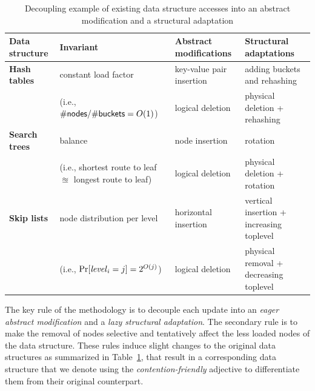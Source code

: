 \begin{table}
\begin{center}
{\footnotesize
\renewcommand{\tabcolsep}{1pt}
\renewcommand{\arraystretch}{1}
\begin{tabular}{|l|l|l|l|}%
  \hline
  {\bf Data structure} & {\bf Invariant} & {\bf Abstract modifications} & {\bf Structural adaptations} \\ \hline\hline

  {\bf Hash tables} & constant load factor & key-value pair insertion & adding buckets and rehashing \\
  & (i.e., $\#\lit{nodes} / \#\lit{buckets} = O(1)$) & logical deletion & physical deletion + rehashing\\ \hline
    {\bf Search trees} & balance & node insertion & rotation \\
  & (i.e., shortest route to leaf $\approxeq$ longest route to leaf) & logical deletion & physical deletion + rotation \\ \hline
  {\bf Skip lists} & node distribution per level & horizontal insertion & vertical insertion + increasing toplevel \\
  & (i.e., $\Pr[\ms{level}_i=j] = 2^{O(j)}$) & logical deletion & physical removal + decreasing toplevel \\ \hline
\end{tabular}}
\end{center}
\vspace{-1.5em}
\caption{\footnotesize Decoupling example of existing data structure accesses into an abstract modification and a structural adaptation\label{table:restructuring}}
\end{table}

The key rule of the methodology is to decouple each update into an \emph{eager abstract modification} and a \emph{lazy structural adaptation}. The secondary rule is to make the removal of 
nodes selective and tentatively affect the less loaded nodes of the data structure.
These rules induce 
slight changes to the original data structures as summarized in Table~\ref{table:restructuring}, that result in a corresponding 
data structure that we denote using the \emph{contention-friendly} adjective to differentiate them 
from their original counterpart.

